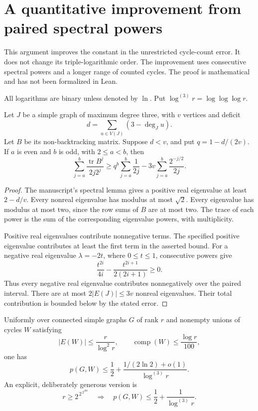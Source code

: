 \section{A quantitative improvement from paired spectral powers}
\label{sec:paired-spectral-powers}

This argument improves the constant in the unrestricted cycle-count error.
It does not change its triple-logarithmic order.
The improvement uses consecutive spectral powers and a longer range of counted cycles.
The proof is mathematical and has not been formalized in Lean.

All logarithms are binary unless denoted by $\ln$.
Put $\log^{(3)}r=\log\log\log r$.

\begin{lemma}\label{lem:paired-spectral-powers}
Let $J$ be a simple graph of maximum degree three, with $v$ vertices and deficit
\[
 d=\sum_{u\in V(J)}(3-\deg_J u).
\]
Let $B$ be its non-backtracking matrix.
Suppose $d<v$, and put $q=1-d/(2v)$.
If $a$ is even and $b$ is odd, with $2\le a<b$, then
\[
 \sum_{j=a}^b\frac{\operatorname{tr}B^j}{2j2^j}
 \ge q^b\sum_{j=a}^b\frac1{2j}
       -3v\sum_{j=a}^b\frac{2^{-j/2}}{2j}.
\]
\end{lemma}

\begin{proof}
The manuscript's spectral lemma gives a positive real eigenvalue at least $2-d/v$.
Every nonreal eigenvalue has modulus at most $\sqrt2$.
Every eigenvalue has modulus at most two, since the row sums of $B$ are at most two.
The trace of each power is the sum of the corresponding eigenvalue powers, with multiplicity.

Positive real eigenvalues contribute nonnegative terms.
The specified positive eigenvalue contributes at least the first term in the asserted bound.
For a negative real eigenvalue $\lambda=-2t$, where $0\le t\le1$, consecutive powers give
\[
 \frac{t^{2i}}{4i}-\frac{t^{2i+1}}{2(2i+1)}\ge0.
\]
Thus every negative real eigenvalue contributes nonnegatively over the paired interval.
There are at most $2|E(J)|\le3v$ nonreal eigenvalues.
Their total contribution is bounded below by the stated error.
\end{proof}

\begin{theorem}
\label{thm:paired-forest-constant}
Uniformly over connected simple graphs $G$ of rank $r$ and nonempty unions of cycles $W$ satisfying
\[
 |E(W)|\le\frac{r}{\log^2r},\qquad
 \operatorname{comp}(W)\le\frac{\log r}{100},
\]
one has
\[
 p(G,W)\le\frac12+
 \frac{1/(2\ln2)+o(1)}{\log^{(3)}r}.
\]
An explicit, deliberately generous version is
\[
 r\ge 2^{\,2^{\,2^{100}}}
 \quad\Longrightarrow\quad
 p(G,W)\le\frac12+\frac1{\log^{(3)}r}.
\]
\end{theorem}

